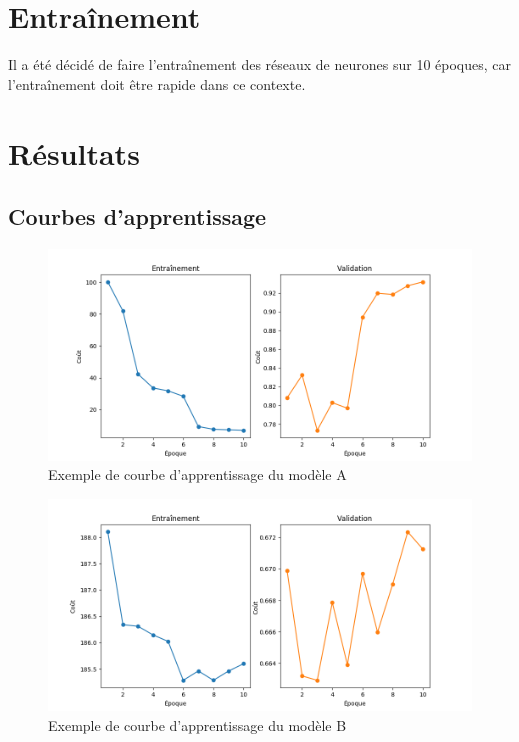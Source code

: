 \section{Entraînement}
    Il a été décidé de faire l'entraînement des réseaux de neurones sur 10 époques, car l'entraînement doit être rapide dans ce contexte.
    
\section{Résultats}

\subsection{Courbes d'apprentissage}

    \begin{figure}[H]
        \centering
        \includegraphics[width=16cm]{images/learning_curves_a.png}
        \caption{Exemple de courbe d'apprentissage du modèle A}
        \label{fig:learning_curves_a}
    \end{figure}

    \begin{figure}[H]
        \centering
        \includegraphics[width=16cm]{images/learning_curves_b.png}
        \caption{Exemple de courbe d'apprentissage du modèle B}
        \label{fig:learning_curves_b}
    \end{figure}

